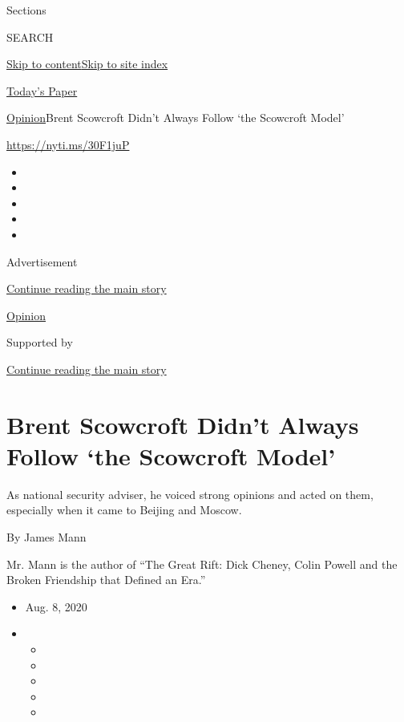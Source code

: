 Sections

SEARCH

\protect\hyperlink{site-content}{Skip to
content}\protect\hyperlink{site-index}{Skip to site index}

\href{https://myaccount.nytimes.com/auth/login?response_type=cookie\&client_id=vi}{}

\href{https://www.nytimes.com/section/todayspaper}{Today's Paper}

\href{/section/opinion}{Opinion}\textbar{}Brent Scowcroft Didn't Always
Follow `the Scowcroft Model'

\href{https://nyti.ms/30F1juP}{https://nyti.ms/30F1juP}

\begin{itemize}
\item
\item
\item
\item
\item
\end{itemize}

Advertisement

\protect\hyperlink{after-top}{Continue reading the main story}

\href{/section/opinion}{Opinion}

Supported by

\protect\hyperlink{after-sponsor}{Continue reading the main story}

\hypertarget{brent-scowcroft-didnt-always-follow-the-scowcroft-model}{%
\section{Brent Scowcroft Didn't Always Follow `the Scowcroft
Model'}\label{brent-scowcroft-didnt-always-follow-the-scowcroft-model}}

As national security adviser, he voiced strong opinions and acted on
them, especially when it came to Beijing and Moscow.

By James Mann

Mr. Mann is the author of ``The Great Rift: Dick Cheney, Colin Powell
and the Broken Friendship that Defined an Era.''

\begin{itemize}
\item
  Aug. 8, 2020
\item
  \begin{itemize}
  \item
  \item
  \item
  \item
  \item
  \end{itemize}
\end{itemize}

